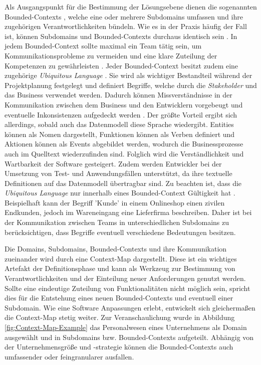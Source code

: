 Als Ausgangspunkt für die Bestimmung der Lösungsebene dienen die sogenannten Bounded-Contexts \cite[S. 57]{Vernon.2015}, welche eine oder mehrere Subdomains umfassen und ihre zugehörigen Verantwortlichkeiten bündeln. Wie es in der Praxis häufig der Fall ist, können Subdomains und Bounded-Contexts durchaus identisch sein \cite[S. 57]{Vernon.2015}. In jedem Bounded-Context sollte maximal ein Team tätig sein, um Kommunikationsprobleme zu vermeiden und eine klare Zuteilung der Kompetenzen zu gewährleisten \cite{Brandolini.2021}. Jeder Bounded-Context besitzt zudem eine zugehörige \emph{Ubiquitous Language} \cite[S. 62]{Vernon.2015}. Sie wird als wichtiger Bestandteil während der Projektplanung festgelegt und definiert Begriffe, welche durch die \emph{\Gls{Stakeholder}} und das Business verwendet werden. Dadurch können Missverständnisse in der Kommunikation zwischen dem Business und den Entwicklern vorgebeugt und eventuelle Inkonsistenzen aufgedeckt werden \cite[S. 336f.]{Evans.2011}. Der größte Vorteil ergibt sich allerdings, sobald auch das Datenmodell diese Sprache wiedergibt. Entities können als Nomen dargestellt, Funktionen können als Verben definiert und Aktionen können als Events abgebildet werden, wodurch die Businessprozesse auch im Quelltext wiederzufinden sind. Folglich wird die Verständlichkeit und Wartbarkeit der Software \cite[S. 24ff.]{Evans.2011} gesteigert. Zudem werden Entwickler bei der Umsetzung von Test- und Anwendungsfällen unterstützt, da ihre textuelle Definitionen auf das Datenmodell übertragbar sind. Zu beachten ist, dass die \emph{Ubiquitous Language} nur innerhalb eines Bounded-Context Gültigkeit hat \cite[S. 62]{Vernon.2015}. Beispielhaft kann der Begriff 'Kunde' in einem Onlineshop einen zivilen Endkunden, jedoch im Wareneingang eine Lieferfirma beschreiben. Daher ist bei der Kommunikation zwischen Teams in unterschiedlichen Subdomains zu berücksichtigen, dass Begriffe eventuell verschiedene Bedeutungen besitzen.

Die Domains, Subdomains, Bounded-Contexts und ihre Kommunikation zueinander wird durch eine Context-Map dargestellt. Diese ist ein wichtiges Artefakt der Definitionsphase und kann als Werkzeug zur Bestimmung von Verantwortlichkeiten und der Einteilung neuer Anforderungen genutzt werden. Sollte eine eindeutige Zuteilung von Funktionalitäten nicht möglich sein, spricht dies für die Entstehung eines neuen Bounded-Contexts und eventuell einer Subdomain. Wie eine Software Anpassungen erlebt, entwickelt sich gleichermaßen die Context-Map stetig weiter. \cite[S. 87ff]{Vernon.2015} Zur Veranschaulichung wurde in Abbildung \ref{fig:Context-Map-Example} das Personalwesen eines Unternehmens als Domain ausgewählt und in Subdomains bzw. Bounded-Contexts aufgeteilt. Abhängig von der Unternehmensgröße und -strategie können die Bounded-Contexts auch umfassender oder feingranularer ausfallen.

